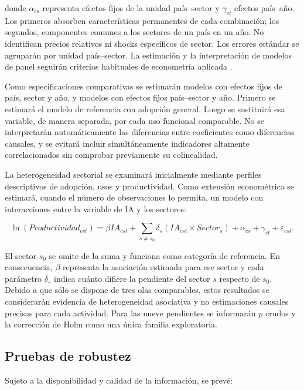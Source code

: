 \documentclass[12pt,a4paper]{article}
\begin{document}
donde $\alpha_{cs}$ representa efectos fijos de la unidad país--sector y $\gamma_{ct}$ efectos país--año. Los primeros absorben características permanentes de cada combinación; los segundos, componentes comunes a los sectores de un país en un año. No identifican precios relativos ni shocks específicos de sector. Los errores estándar se agruparán por unidad país--sector. La estimación y la interpretación de modelos de panel seguirán criterios habituales de econometría aplicada \citep{wooldridge2010econometric}.

Como especificaciones comparativas se estimarán modelos con efectos fijos de país, sector y año, y modelos con efectos fijos país--sector y año. Primero se estimará el modelo de referencia con adopción general. Luego se sustituirá esa variable, de manera separada, por cada uso funcional comparable. No se interpretarán automáticamente las diferencias entre coeficientes como diferencias causales, y se evitará incluir simultáneamente indicadores altamente correlacionados sin comprobar previamente su colinealidad.

La heterogeneidad sectorial se examinará inicialmente mediante perfiles descriptivos de adopción, usos y productividad. Como extensión econométrica se estimará, cuando el número de observaciones lo permita, un modelo con interacciones entre la variable de IA y los sectores:

\begin{equation}
 \ln(Productividad_{cst}) =
 \beta IA_{cst}
 + \sum_{s \neq s_0} \delta_s\left(IA_{cst}\times Sector_s\right)
 + \alpha_{cs} + \gamma_{ct} + \varepsilon_{cst}.
\end{equation}

El sector $s_0$ se omite de la suma y funciona como categoría de referencia. En consecuencia, $\beta$ representa la asociación estimada para ese sector y cada parámetro $\delta_s$ indica cuánto difiere la pendiente del sector $s$ respecto de $s_0$. Debido a que sólo se dispone de tres olas comparables, estos resultados se considerarán evidencia de heterogeneidad asociativa y no estimaciones causales precisas para cada actividad. Para las nueve pendientes se informarán $p$ crudos y la corrección de Holm como una única familia exploratoria.

\subsection{Pruebas de robustez}

Sujeto a la disponibilidad y calidad de la información, se prevé:
\end{document}
